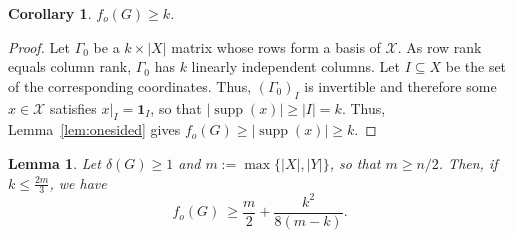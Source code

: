 \documentclass[11pt]{article}
\newtheorem{lemma}[theorem]{Lemma}
\newtheorem{corollary}[theorem]{Corollary}
\theoremstyle{definition}
\theoremstyle{remark}
\newcommand{\supp}{\operatorname{supp}}
\newcommand{\fo}{f_o}
\newcommand{\1}{\mathbf{1}}
\begin{document}
	\begin{corollary}\label{cor:rank}
		$f_o(G)\geq k$. 
	\end{corollary}
	
	
	\begin{proof}
		Let $\Gamma_0$ be a $k\times|X|$ matrix whose rows form a basis of $\mathcal{X}$. As row rank equals column rank, $\Gamma_0$ has $k$ linearly independent columns. Let $I\subseteq X$ be the set of the corresponding coordinates. Thus, $(\Gamma_0)_I$ is invertible and therefore some $x\in\mathcal{X}$ satisfies $x|_I=\mathbf{1}_I$, so that $|\supp(x)|\ge|I|=k$. Thus, Lemma~\ref{lem:onesided} gives $\fo(G)\ge|\supp(x)|\ge k$.
	\end{proof}
	
	
	\begin{lemma}\label{lem:ranksensitive}
		Let $\delta(G)\ge1$ and $m:=\max\{|X|,|Y|\}$, so that $m\ge n/2$. Then, if $k\leq \frac{2m}{3}$, we have
		\[
		\fo(G)\ \ge
		\dfrac{m}{2}+\dfrac{k^{2}}{8(m-k)}. 
		\]
	\end{lemma}
	
\end{document}
